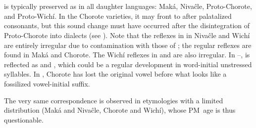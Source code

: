 \section{}\label{pm-u}
 is typically preserved as  in all daughter languages: Maká, Nivaĉle, Proto-Chorote, and Proto-Wichí. In the Chorote varieties, it may front to  after palatalized consonants, but this sound change must have occurred after the disintegration of Proto-Chorote into dialects (see ). Note that the reflexes in  in Nivaĉle and Wichí are entirely irregular due to contamination with those of ; the regular reflexes are found in Maká and Chorote. The Wichí reflexes in  and  are also irregular. In --,  is reflected as  and , which could be a regular development in word-initial unstressed syllables. In , Chorote has lost the original vowel before what looks like a fossilized vowel-initial suffix.

\begin{exe}
    \ex \lick
    \ex \centipede
    \ex \soninlaw
    \ex \palm
    \ex \fart
    \ex \finger
    \ex \wax
    \ex \sunn
    \ex \answer
    \ex \grabwork
    \ex \eatkun
    \ex \heat
    \ex \meet
    \ex \sweat
    \ex \hornclub
    \ex \coldn
    \ex \barnowl
    \ex \thorncutjan
    \ex \bow
    \ex \yicalhuk
    \ex \daylhuma
    \ex \girl
    \ex \feces
    \ex \bonenu
    \ex \dog
    \ex \dayworld \label{u-dayworld}
    \ex \tapeti
    \ex \beard \label{u-beard}
    \ex \distrust
    \ex \kingvulture \label{u-kingvulture}
    \ex \vagina
    \ex \anteater
    \ex \likelove
    \ex \cat
    \ex \blind
    \ex \ant
    \ex \yellowlegs
    \ex \eatvt
    \ex \hardv
    \ex \duraznillo
    \ex \leniosa
    \ex \tired
    \ex \nest
    \ex \termitehouse
    \ex \passv
    \ex \egg
    \ex \tuscaf \label{u-tuscaf}
    \ex \tuscat \label{u-tuscat}
    \ex \tuscag \label{u-tuscag}
    \ex \grass
    \ex \firewoodhuk
    \ex \pushv
    \ex \woman
    \ex \iguana
    \ex \knee
    \ex \snakeatuj
    \ex \doveula
    \ex \urinate
    \ex \urine
    \ex \puma \label{u-puma}
\end{exe}

The very same correspondence is observed in etymologies with a limited distribution (Maká and Nivaĉle, Chorote and Wichí), whose PM~age is thus questionable.

